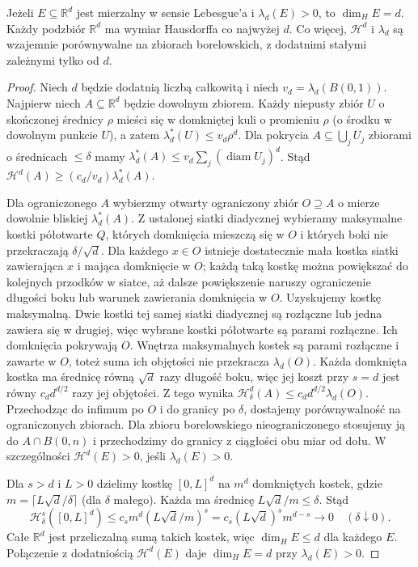 \begin{twierdzenie}
\label{thm:euclidean-dimension-26}
Jeżeli $E\subseteq\mathbb R^d$ jest mierzalny
w sensie Lebesgue'a i $\lambda_d(E)>0$, to $\dim_HE=d$. Każdy podzbiór
$\mathbb R^d$ ma wymiar Hausdorffa co najwyżej $d$.
Co więcej, $\mathcal H^d$ i $\lambda_d$ są wzajemnie
porównywalne na zbiorach borelowskich, z dodatnimi
stałymi zależnymi tylko od $d$.
\end{twierdzenie}
\begin{proof}
Niech $d$ będzie dodatnią liczbą całkowitą i niech
$v_d=\lambda_d(B(0,1))$. Najpierw niech $A\subseteq\mathbb R^d$
będzie dowolnym zbiorem. Każdy niepusty zbiór $U$ o skończonej średnicy $\rho$ mieści się w domkniętej
kuli o promieniu $\rho$ (o środku w dowolnym punkcie $U$),
a zatem $\lambda_d^*(U)\le v_d\rho^d$.
Dla pokrycia $A\subseteq\bigcup_jU_j$ zbiorami o
średnicach $\le\delta$ mamy
$\lambda_d^*(A)\le v_d\sum_j(\operatorname{diam}U_j)^d$.
Stąd $\mathcal H^d(A)\ge(c_d/v_d)\lambda_d^*(A)$.

Dla ograniczonego $A$ wybierzmy otwarty ograniczony
zbiór $O\supseteq A$ o mierze dowolnie bliskiej
$\lambda_d^*(A)$. Z ustalonej siatki diadycznej wybieramy maksymalne
kostki półotwarte $Q$, których domknięcia mieszczą się
w $O$ i których boki nie przekraczają $\delta/\sqrt d$.
Dla każdego $x\in O$ istnieje dostatecznie mała kostka
siatki zawierająca $x$ i mająca domknięcie w $O$;
każdą taką kostkę można powiększać do kolejnych
przodków w siatce, aż dalsze powiększenie naruszy
ograniczenie długości boku lub warunek zawierania
domknięcia w $O$. Uzyskujemy kostkę maksymalną.
Dwie kostki tej samej siatki diadycznej są rozłączne
lub jedna zawiera się w drugiej, więc wybrane kostki
półotwarte są parami rozłączne. Ich domknięcia pokrywają $O$.
Wnętrza maksymalnych kostek są parami rozłączne
i zawarte w $O$, toteż suma ich objętości nie
przekracza $\lambda_d(O)$. Każda domknięta kostka
ma średnicę równą $\sqrt d$ razy długość boku,
więc jej koszt przy $s=d$ jest równy $c_dd^{d/2}$
razy jej objętości. Z tego wynika
$\mathcal H^d_\delta(A)\le c_dd^{d/2}\lambda_d(O)$.
Przechodząc do infimum po $O$ i do granicy po $\delta$,
dostajemy porównywalność na ograniczonych zbiorach.
Dla zbioru borelowskiego nieograniczonego stosujemy
ją do $A\cap B(0,n)$ i przechodzimy do granicy
z ciągłości obu miar od dołu. W szczególności $\mathcal H^d(E)>0$, jeśli
$\lambda_d(E)>0$.

Dla $s>d$ i $L>0$ dzielimy kostkę $[0,L]^d$
na $m^d$ domkniętych kostek, gdzie
$m=\lceil L\sqrt d/\delta\rceil$ (dla $\delta$ małego).
Każda ma średnicę $L\sqrt d/m\le\delta$.
Stąd
\[
 \mathcal H^s_\delta([0,L]^d)
 \le c_s m^d(L\sqrt d/m)^s
 =c_s(L\sqrt d)^s m^{d-s}\longrightarrow0
 \quad(\delta\downarrow0).
\]
Całe $\mathbb R^d$ jest przeliczalną sumą takich
kostek, więc $\dim_HE\le d$ dla każdego $E$.
Połączenie z dodatniością $\mathcal H^d(E)$ daje
$\dim_HE=d$ przy $\lambda_d(E)>0$.
\end{proof}

